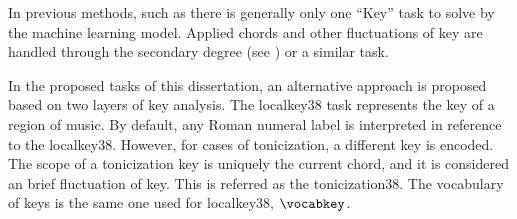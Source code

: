 
In previous methods, such as \textcite{chen2018functional,
chen2019harmony, micchi2020not, micchi2021deep,
mcleod2021modular} there is generally only one ``Key'' task
to solve by the machine learning model. Applied chords and
other fluctuations of key are handled through the secondary
degree (see ) or a similar
task.

In the proposed tasks of this dissertation, an alternative
approach is proposed based on two layers of key analysis.
The \gls{localkey38} task represents the key of a region of
music. By default, any Roman numeral label is interpreted in
reference to the \gls{localkey38}. However, for cases of
tonicization, a different key is encoded. The scope of a
tonicization key is uniquely the current chord, and it is
considered an brief fluctuation of key. This is referred as
the \gls{tonicization38}. The vocabulary of keys is the same
one used for \gls{localkey38}, $\vocabkey$.
